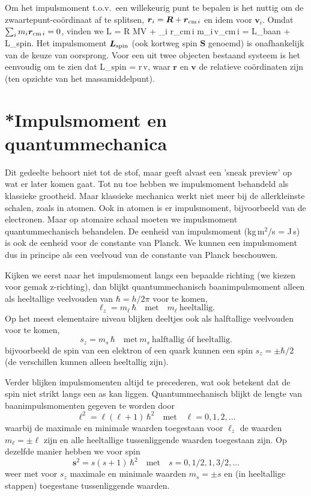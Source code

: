 Om het impulsmoment t.o.v.\ een willekeurig punt te bepalen is het
nuttig om de zwaartepunt-co\"ordinaat af te splitsen,
$\mbox{\boldmath $r$}_i = \mbox{\boldmath $R$} + \mbox{\boldmath $r$}_{{\rm cm}\,i}$ en idem voor $\bm v_i$. Omdat 
$\sum_i m_i\mbox{\boldmath $r$}_{{\rm cm}\,i} = 0$, vinden we
\be
\bm L = \bm R \times M\bm V
+ \sum_i \bm r_{{\rm cm}\,i} \times m_i\,\bm v_{{\rm cm}\,i}
= \bm L_{\rm baan} + \bm L_{\rm spin}.
\ee
Het impulsmoment $\mbox{\boldmath $L$}_{\rm spin}$ (ook kortweg spin $\bm S$ genoemd)
is onafhankelijk van de keuze van oorsprong. Voor een uit twee objecten
bestaand systeem is het eenvoudig om te zien dat
\be
\bm L_{\rm spin} = \bm r\times \mu\,\bm v,
\ee
waar $\bm r$ en $\bm v$ de relatieve co\"ordinaten zijn 
(ten opzichte van het massamiddelpunt).

\section{*Impulsmoment en quantummechanica}

Dit gedeelte behoort niet tot de stof, maar geeft alvast een 'sneak preview' op wat er later komen gaat. Tot nu toe hebben we impulsmoment behandeld als klassieke grootheid. Maar klassieke 
mechanica werkt niet meer bij de allerkleinste schalen, zoals in atomen. Ook in atomen is er impulsmoment, bijvoorbeeld van de electronen. Maar op atomaire schaal moeten we impulsmoment quantummechanisch behandelen. De eenheid van impuls\-moment
(kg\,m$^2$/s = J\,s) is ook de eenheid voor de constante van Planck.
We kunnen een impulsmoment dus in principe als een veelvoud van
de constante van Planck beschouwen.

Kijken we eerst naar het impulsmoment langs een bepaalde richting
(we kiezen voor gemak z-richting), dan blijkt
quantummechanisch baan\-impuls\-moment alleen als heeltallige
veelvouden van $\hbar = h/2\pi$ voor te komen,
\[
\ell_z = m_\ell\,\hbar \quad\mbox{met}\quad m_\ell \ \mbox{heeltallig}.
\]
Op het meest elementaire niveau blijken deeltjes ook als half\-tallige
veelvouden voor te komen, 
\[
s_z = m_s\,\hbar \quad\mbox{met}\ m_s \ \mbox{halftallig \'of heeltallig}.
\]
bijvoorbeeld de spin van een elektron
of een quark kunnen een spin $s_z = \pm \hbar/2$ (de verschillen
kunnen alleen heeltallig zijn). 

Verder blijken impuls\-momenten altijd te precederen, wat ook betekent
dat de spin niet strikt langs een as kan liggen. Quantum\-mechanisch
blijkt de lengte van baan\-impulsmomenten gegeven te worden
door 
\[
\bm \ell^2 = \ell(\ell + 1)\,\hbar^2 \quad \mbox{met} 
\quad \ell = 0, 1, 2, \ldots
\]
waarbij de maximale en minimale waarden toegestaan voor $\ell_z$ 
de waarden $m_\ell = \pm\ell$ zijn en alle heeltallige tussen\-liggende 
waarden toegestaan zijn. Op dezelfde manier hebben we voor spin
\[
\bm s^2 = s(s + 1)\,\hbar^2 \quad \mbox{met} 
\quad s = 0, 1/2, 1, 3/2, \ldots
\]
weer met voor $s_z$ maximale en minimale waarden $m_s = \pm s$ en
(in heeltallige stappen) toegestane tussenliggende waarden.

